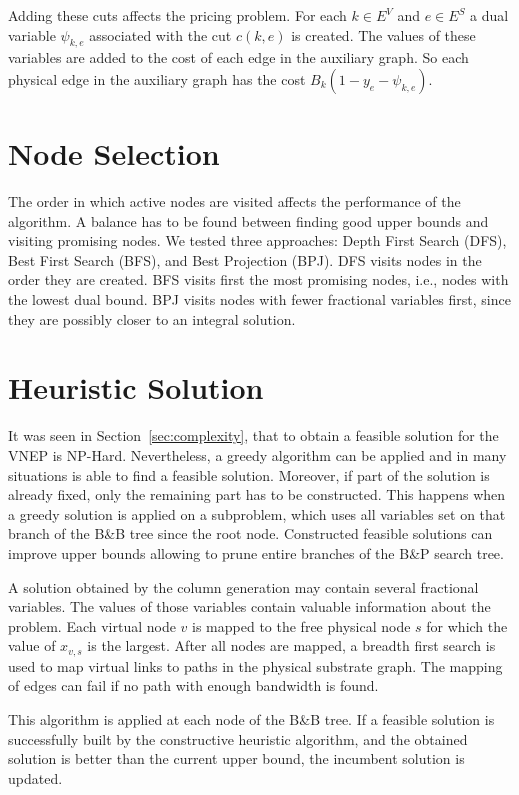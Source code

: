 Adding these cuts affects the pricing problem. For each $k \in E^V$ and $e \in E^S$ a dual variable $\psi_{k,e}$ associated with the cut $c(k,e)$ is created. The values of these variables are added to the cost of each edge in the auxiliary graph. So each physical edge in the auxiliary graph has the cost $B_{k}(1 - y_{e} - \psi_{k,e})$.

\section{Node Selection}
\label{sec:nodesel}
The order in which active nodes are visited affects the performance of the algorithm. A balance has to be found between finding good upper bounds and visiting promising nodes. We tested three approaches: Depth First Search (DFS), Best First Search (BFS), and Best Projection (BPJ). DFS visits nodes in the order they are created. BFS visits first the most promising nodes, i.e., nodes with the lowest dual bound. BPJ visits nodes with fewer fractional variables first, since they are possibly closer to an integral solution.

\section{Heuristic Solution}
\label{sec:heur}
It was seen in Section~\ref{sec:complexity}, that to obtain a feasible solution for the VNEP is NP-Hard.
Nevertheless, a greedy algorithm can be applied and in many situations is able to find a feasible solution.
Moreover, if part of the solution is already fixed, only the remaining part has to be constructed.
This happens when a greedy solution is applied on a subproblem, which uses all variables set on that branch of the B\&B tree since the root node.
Constructed feasible solutions can improve upper bounds allowing to prune entire branches of the B\&P search tree.

A solution obtained by the column generation may contain several fractional variables. 
The values of those variables contain valuable information about the problem. 
Each virtual node $v$ is mapped to the free physical node $s$ for which the value of $x_{v,s}$ is the largest. 
After all nodes are mapped, a breadth first search is used to map virtual links to paths in the physical substrate graph. The mapping of edges can fail if no path with enough bandwidth is found.

This algorithm is applied at each node of the B\&B tree. If a feasible solution is successfully built by the constructive heuristic algorithm, and the obtained solution is better than the current upper bound, the incumbent solution is updated.

